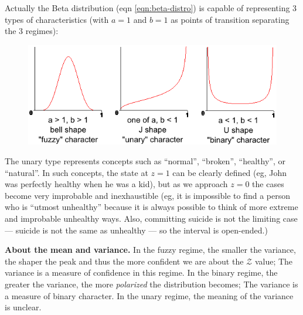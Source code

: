 Actually the Beta distribution (eqn \ref{eqn:beta-distro}) is capable of representing 3 types of characteristics (with $a = 1$ and $b = 1$ as points of transition separating the 3 regimes):
\begin{figure}[H]
\centering
\includegraphics[scale=0.8]{binary-fuzzy-unary-characters.png}
\end{figure}
The unary type represents concepts such as ``normal'', ``broken'', ``healthy'', or ``natural''.  In such concepts, the state at $z = 1$ can be clearly defined (eg, John was perfectly healthy when he was a kid), but as we approach $z = 0$ the cases become very improbable and inexhaustible (eg, it is impossible to find a person who is ``utmost unhealthy'' because it is always possible to think of more extreme and improbable unhealthy ways.  Also, committing suicide is not the limiting case --- suicide is not the same as unhealthy --- so the interval is open-ended.)

\textbf{About the mean and variance.}  In the fuzzy regime, the smaller the variance, the shaper the peak and thus the more confident we are about the $\mathcal{Z}$ value;  The variance is a measure of confidence in this regime.  In the binary regime, the greater the variance, the more \textit{polarized} the distribution becomes;  The variance is a measure of binary character.  In the unary regime, the meaning of the variance is unclear.



